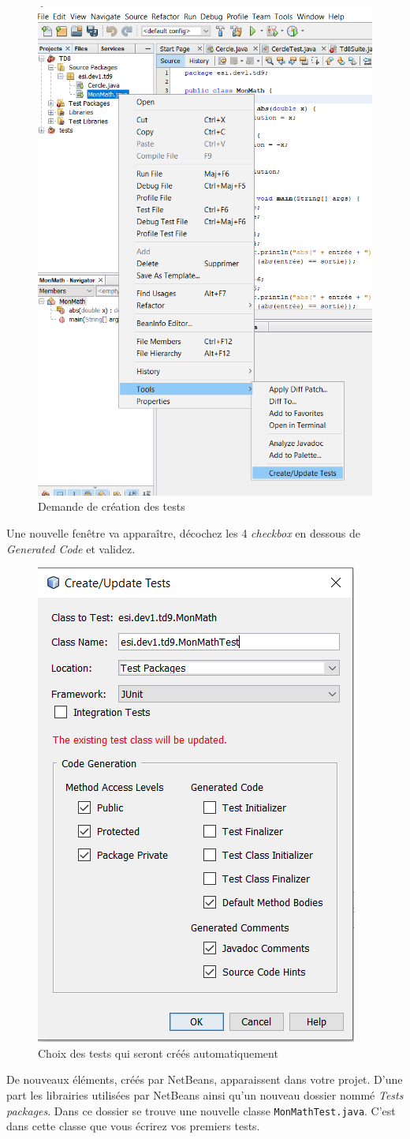 \documentclass[a4paper,11pt]{style-esi/td}
\begin{document}
	\begin{figure}[hbt!]
	\begin{center}
		\includegraphics[width=.4\textwidth]{images/create_tests}
	\end{center}
	\caption{Demande de création des tests}
	\end{figure}


	Une nouvelle fenêtre va apparaître, décochez les 4 \textit{checkbox} en
	dessous de \textit{Generated Code} et validez. 

	\begin{figure}[hbt!]
	\begin{center}
		\includegraphics[width=.3\textwidth]{images/config_tests}
	\end{center}
	\caption{Choix des tests qui seront créés automatiquement}
	\end{figure}

	De nouveaux éléments, créés par NetBeans, apparaissent dans votre projet.
	D’une part les librairies utilisées par NetBeans ainsi qu’un nouveau
	dossier nommé \emph{Tests packages}. Dans ce dossier se trouve une nouvelle
	classe \texttt{MonMathTest.java}. C'est dans cette classe que vous écrirez vos
	premiers tests.
\end{document}
